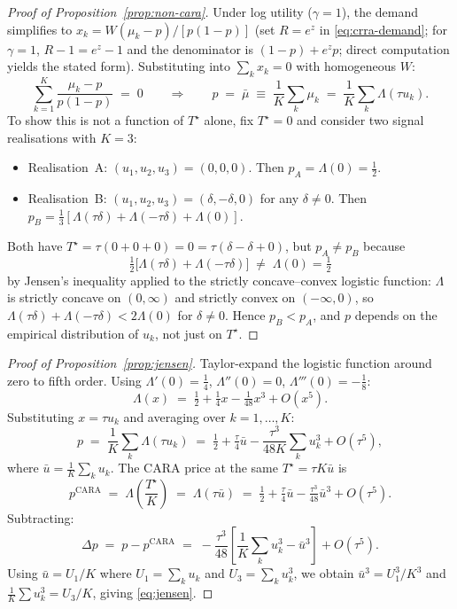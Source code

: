 \documentclass[12pt,letterpaper]{article}
\theoremstyle{definition}
\theoremstyle{remark}
\newcommand{\Lam}{\Lambda}            %
\newcommand{\Tstar}{T^{\!\star}}
\newcommand{\1}{\mathbf{1}}
\begin{document}
\begin{proof}[Proof of Proposition~\ref{prop:non-cara}]
Under log utility ($\gamma=1$), the demand simplifies to
$x_{k}=W(\mu_{k}-p)/[p(1-p)]$ (set $R=e^{z}$ in \eqref{eq:crra-demand};
for $\gamma=1$, $R-1=e^{z}-1$ and the denominator is
$(1-p)+e^{z}p$; direct computation yields the stated form).
Substituting into $\sum_{k}x_{k}=0$ with homogeneous $W$:
\[
   \sum_{k=1}^{K}\frac{\mu_{k}-p}{p(1-p)} \;=\; 0
   \qquad\Longrightarrow\qquad
   p \;=\; \bar\mu \;\equiv\; \frac{1}{K}\sum_{k}\mu_{k}
   \;=\; \frac{1}{K}\sum_{k}\Lam(\tau u_{k}).
\]
To show this is not a function of $\Tstar$ alone, fix $\Tstar=0$ and
consider two signal realisations with $K=3$:
\begin{itemize}[topsep=2pt,itemsep=2pt]
\item Realisation~A: $(u_{1},u_{2},u_{3})=(0,0,0)$. Then
$p_{A}=\Lam(0)=\tfrac12$.
\item Realisation~B: $(u_{1},u_{2},u_{3})=(\delta,-\delta,0)$ for any
$\delta\neq 0$. Then
$p_{B}=\tfrac13[\Lam(\tau\delta)+\Lam(-\tau\delta)+\Lam(0)]$.
\end{itemize}
Both have $\Tstar=\tau(0+0+0)=0=\tau(\delta-\delta+0)$, but $p_{A}\neq
p_{B}$ because
\[
   \tfrac12\bigl[\Lam(\tau\delta)+\Lam(-\tau\delta)\bigr]
   \;\neq\; \Lam(0) = \tfrac12
\]
by Jensen's inequality applied to the strictly concave--convex logistic
function: $\Lam$ is strictly concave on $(0,\infty)$ and strictly convex
on $(-\infty,0)$, so $\Lam(\tau\delta)+\Lam(-\tau\delta)<2\Lam(0)$ for
$\delta\neq 0$. Hence $p_{B}<p_{A}$, and $p$ depends on the empirical
distribution of $u_{k}$, not just on $\Tstar$.
\end{proof}

\begin{proof}[Proof of Proposition~\ref{prop:jensen}]
Taylor-expand the logistic function around zero to fifth order. Using
$\Lam'(0)=\tfrac14$, $\Lam''(0)=0$, $\Lam'''(0)=-\tfrac18$:
\[
   \Lam(x) \;=\; \tfrac12+\tfrac14 x - \tfrac{1}{48}x^{3}+O(x^{5}).
\]
Substituting $x=\tau u_{k}$ and averaging over $k=1,\ldots,K$:
\[
   p \;=\; \frac{1}{K}\sum_{k}\Lam(\tau u_{k})
   \;=\; \tfrac12+\tfrac{\tau}{4}\bar u
         -\frac{\tau^{3}}{48K}\sum_{k}u_{k}^{3}+O(\tau^{5}),
\]
where $\bar u=\tfrac{1}{K}\sum_{k}u_{k}$.
The CARA price at the same $\Tstar=\tau K\bar u$ is
\[
   p^{\mathrm{CARA}}
   \;=\; \Lam\!\left(\frac{\Tstar}{K}\right)
   \;=\; \Lam(\tau\bar u)
   \;=\; \tfrac12+\tfrac{\tau}{4}\bar u - \tfrac{\tau^{3}}{48}\bar u^{3}
         +O(\tau^{5}).
\]
Subtracting:
\[
   \Delta p \;=\; p - p^{\mathrm{CARA}}
   \;=\; -\frac{\tau^{3}}{48}\left[
         \frac{1}{K}\sum_{k}u_{k}^{3} - \bar u^{3}\right]
   +O(\tau^{5}).
\]
Using $\bar u=U_{1}/K$ where $U_{1}=\sum_{k}u_{k}$ and
$U_{3}=\sum_{k}u_{k}^{3}$, we obtain $\bar u^{3}=U_{1}^{3}/K^{3}$ and
$\tfrac{1}{K}\sum u_{k}^{3}=U_{3}/K$, giving
\eqref{eq:jensen}.
\end{proof}
\end{document}
